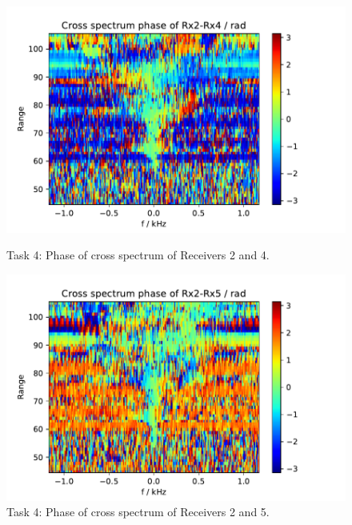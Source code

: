 \begin{figure}[H]
    \centering
    \begin{minipage}{0.48\textwidth}
        \centering
        \includegraphics[width=\textwidth]{graphics/t4/t4-phase-2-4.pdf}
    \caption{Task 4: Phase of cross spectrum of Receivers 2 and 4.}
    \label{fig:t4-phase-2-4}
    \end{minipage}\hfill
    \begin{minipage}{0.48\textwidth}
        \centering
        \includegraphics[width=\textwidth]{graphics/t4/t4-phase-2-5.pdf}
    \caption{Task 4: Phase of cross spectrum of Receivers 2 and 5.}
    \label{fig:t4-phase-2-5}
    \end{minipage}
\end{figure}

